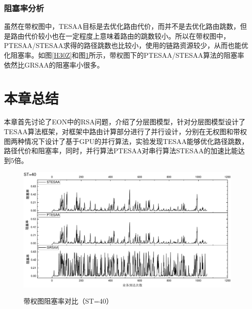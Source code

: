 \subsubsection{阻塞率分析}
虽然在带权图中，TESAA目标是去优化路由代价，而并不是去优化路由跳数，但是路由代价较小也在一定程度上意味着路由的跳数较小。所以在带权图中，PTESAA/STESAA求得的路径跳数也比较小，使用的链路资源较少，从而也能优化阻塞率。如图\ref{H30Z}和图\ref{H40Z}所示，带权图下的PTESAA/STESAA算法的阻塞率依然比GRSAA的阻塞率小很多。



\section{本章总结}
本章首先讨论了EON中的RSA问题，介绍了分层图模型，针对分层图模型设计了TESAA算法框架，对框架中路由计算部分进行了并行设计，分别在无权图和带权图两种情况下设计了基于GPU的并行算法，实验发现TESAA能够优化路径跳数，路径代价和阻塞率，同时，并行算法PTESAA对串行算法STESAA的加速比能达到5倍。
\begin{figure}
\setlength{\abovecaptionskip}{-0.5cm}
\begin{center}
{\includegraphics[width=0.8 \textwidth]{figures/H40Z.pdf}}
\end{center}
\caption{{\footnotesize{带权图阻塞率对比（ST=40）}}}
\label{H40Z}
\end{figure}